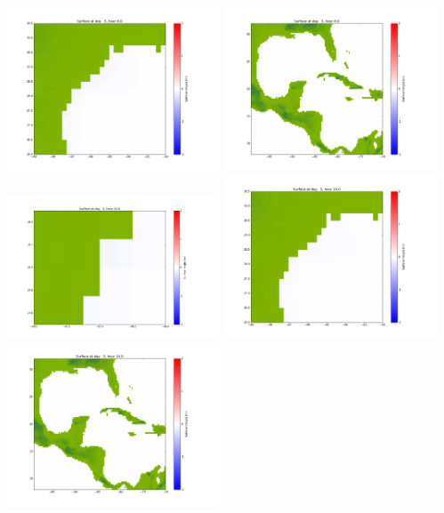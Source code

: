 \documentclass[11pt]{article}
\begin{document}
\includegraphics[width=0.475\textwidth]{frame0088fig1002.png}
\vskip 10pt 
\includegraphics[width=0.475\textwidth]{frame0088fig1003.png}
\vskip 10pt 
\includegraphics[width=0.475\textwidth]{frame0089fig1001.png}
\includegraphics[width=0.475\textwidth]{frame0089fig1002.png}
\vskip 10pt 
\includegraphics[width=0.475\textwidth]{frame0089fig1003.png}
\end{document}
